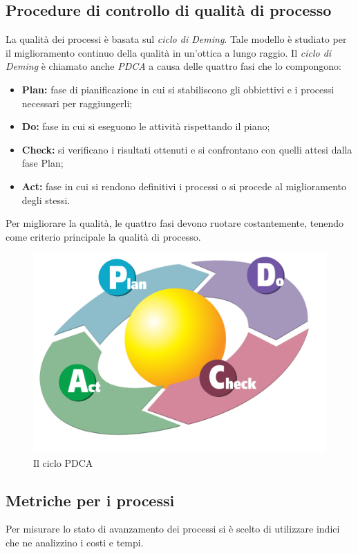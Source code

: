 \subsection{Procedure di controllo di qualità di processo} \label{PDCA}
La qualità dei processi è basata sul \textit{ciclo di Deming}. Tale modello è studiato per il miglioramento continuo della qualità in un'ottica a lungo raggio.
Il \textit{ciclo di Deming} è chiamato anche \textit{\gls{PDCA}} a causa delle quattro fasi che lo compongono:
\begin{itemize}
	\item \textbf{Plan:} fase di pianificazione in cui si stabiliscono gli obbiettivi e i processi necessari per raggiungerli;
	\item \textbf{Do:} fase in cui si eseguono le attività rispettando il piano;
	\item \textbf{Check:} si verificano i risultati ottenuti e si confrontano con quelli attesi dalla fase Plan;
	\item \textbf{Act:} fase in cui si rendono definitivi i processi o si procede al miglioramento degli stessi. 
\end{itemize}
Per migliorare la qualità, le quattro fasi devono ruotare costantemente, tenendo come criterio principale la qualità di processo.
\begin{figure}[h]
\centering
\includegraphics[width=0.7\linewidth]{img/PDCA_Cycle}
\caption[Il ciclo PDCA]{Il ciclo PDCA}
\label{fig:PDCA_Cycle}
\end{figure}


\subsection{Metriche per i processi}
\label{sezione 3.7}
Per misurare lo stato di avanzamento dei processi si è scelto di utilizzare indici che ne analizzino i costi e
tempi.
